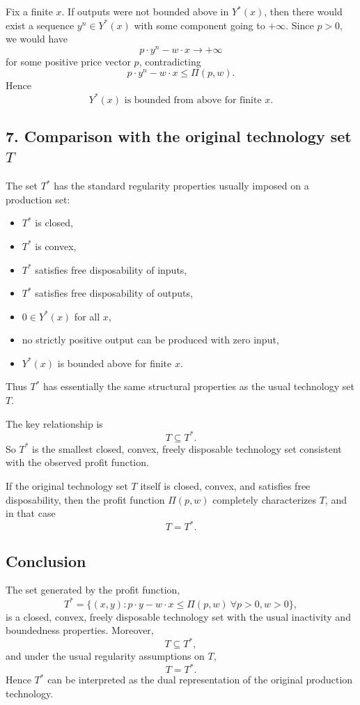 Fix a finite \(x\). If outputs were not bounded above in \(Y^*(x)\), then there would exist a sequence \(y^n\in Y^*(x)\) with some component going to \(+\infty\). Since \(p>0\), we would have
\[
p\cdot y^n-w\cdot x \to +\infty
\]
for some positive price vector \(p\), contradicting
\[
p\cdot y^n-w\cdot x\le \Pi(p,w).
\]
Hence
\[
\boxed{Y^*(x)\text{ is bounded from above for finite }x.}
\]

\subsection*{7. Comparison with the original technology set \(T\)}

The set \(T^*\) has the standard regularity properties usually imposed on a production set:

\begin{itemize}
\item \(T^*\) is closed,
\item \(T^*\) is convex,
\item \(T^*\) satisfies free disposability of inputs,
\item \(T^*\) satisfies free disposability of outputs,
\item \(0\in Y^*(x)\) for all \(x\),
\item no strictly positive output can be produced with zero input,
\item \(Y^*(x)\) is bounded above for finite \(x\).
\end{itemize}

Thus \(T^*\) has essentially the same structural properties as the usual technology set \(T\).

The key relationship is
\[
\boxed{T\subseteq T^*.}
\]
So \(T^*\) is the smallest closed, convex, freely disposable technology set consistent with the observed profit function.

If the original technology set \(T\) itself is closed, convex, and satisfies free disposability, then the profit function \(\Pi(p,w)\) completely characterizes \(T\), and in that case
\[
\boxed{T=T^*.}
\]

\subsection*{Conclusion}

The set generated by the profit function,
\[
T^*=\{(x,y):p\cdot y-w\cdot x\le \Pi(p,w)\ \forall p>0,w>0\},
\]
is a closed, convex, freely disposable technology set with the usual inactivity and boundedness properties. Moreover,
\[
\boxed{T\subseteq T^*,}
\]
and under the usual regularity assumptions on \(T\),
\[
\boxed{T=T^*.}
\]
Hence \(T^*\) can be interpreted as the dual representation of the original production technology.




